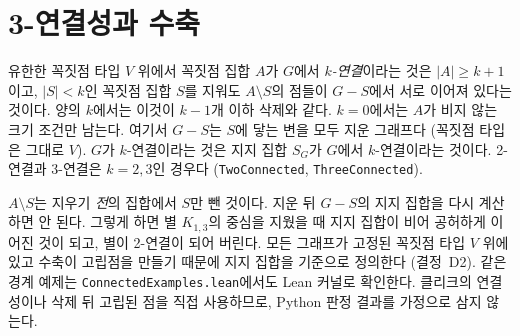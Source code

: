 \section{3-연결성과 수축}

\begin{definition}[\(k\)-연결]
\label{def:conn3}
\leanok
유한한 꼭짓점 타입 \(V\) 위에서 꼭짓점 집합 \(A\)가 \(G\)에서 \emph{\(k\)-연결}이라는 것은
\(|A| \ge k + 1\)이고, \(|S| < k\)인 꼭짓점 집합 \(S\)를 지워도
\(A \setminus S\)의 점들이 \(G - S\)에서 서로 이어져 있다는 것이다. 양의 \(k\)에서는
이것이 \(k - 1\)개 이하 삭제와 같다. \(k = 0\)에서는 \(A\)가 비지 않는 크기 조건만 남는다. 여기서
\(G - S\)는 \(S\)에 닿는 변을 모두 지운 그래프다 (꼭짓점 타입은 그대로 \(V\)). \(G\)가 \(k\)-연결이라는 것은
지지 집합 \(S_G\)가 \(G\)에서 \(k\)-연결이라는 것이다. 2-연결과 3-연결은 \(k = 2, 3\)인 경우다
(\texttt{TwoConnected}, \texttt{ThreeConnected}).

\(A \setminus S\)는 지우기 \emph{전}의 집합에서 \(S\)만 뺀 것이다. 지운 뒤 \(G - S\)의 지지 집합을 다시
계산하면 안 된다. 그렇게 하면 별 \(K_{1,3}\)의 중심을 지웠을 때 지지 집합이 비어 공허하게 이어진 것이
되고, 별이 2-연결이 되어 버린다. 모든 그래프가 고정된 꼭짓점 타입 \(V\) 위에 있고 수축이 고립점을
만들기 때문에 지지 집합을 기준으로 정의한다 (결정~D2).
같은 경계 예제는 \texttt{ConnectedExamples.lean}에서도 Lean 커널로 확인한다. 클리크의 연결성이나
삭제 뒤 고립된 점을 직접 사용하므로, Python 판정 결과를 가정으로 삼지 않는다.
\end{definition}

